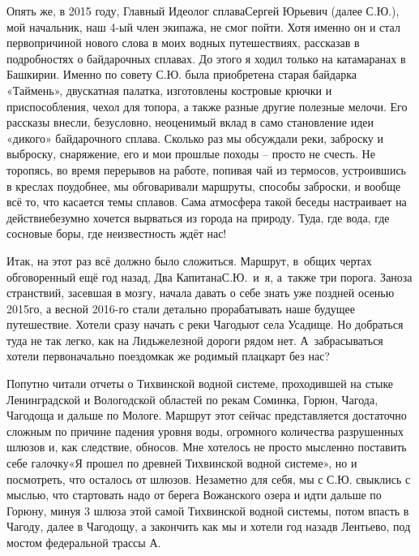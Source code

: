 Опять же, в 2015 году, Главный Идеолог сплава\mdash Сергей Юрьевич (далее С.Ю.), мой начальник, наш 4-ый член экипажа, не смог пойти. Хотя именно он и стал первопричиной нового слова в моих водных путешествиях, рассказав в подробностях о байдарочных сплавах. До этого я ходил только на катамаранах в Башкирии. Именно по совету С.Ю. была приобретена старая байдарка «Таймень», двускатная палатка, изготовлены костровые крючки и приспособления, чехол для топора, а также разные другие полезные мелочи. Его рассказы внесли, безусловно, неоценимый вклад в само становление идеи «дикого» байдарочного сплава. Сколько раз мы обсуждали реки, заброску и выброску, снаряжение, его и мои прошлые походы – просто не счесть. Не торопясь, во время перерывов на работе, попивая чай из термосов, устроившись в креслах поудобнее, мы обговаривали маршруты, способы заброски, и вообще всё то, что касается темы сплавов. Сама атмосфера такой беседы настраивает на действие\mdash безумно хочется вырваться из города на природу. Туда, где вода, где сосновые боры, где неизвестность ждёт нас!

Итак, на этот раз всё должно было сложиться. Маршрут, в~общих чертах обговоренный ещё год назад, Два Капитана\mdash С.Ю.~и~я, а~также три порога. Заноза странствий, засевшая в мозгу, начала давать о себе знать уже поздней осенью 2015\sdash го, а весной 2016-го стали детально прорабатывать наше будущее путешествие. Хотели сразу начать с реки Чагоды\mdash от села Усадище. Но добраться туда не так легко, как на Лидь\mdash железной дороги рядом нет. А~забрасываться хотели первоначально поездом\mdash как же родимый плацкарт без нас? 

Попутно читали отчеты о Тихвинской водной системе, проходившей на стыке Ленинградской и Вологодской областей по рекам Соминка, Горюн, Чагода, Чагодоща и дальше по Мологе. Маршрут этот сейчас представляется достаточно сложным по причине падения уровня воды, огромного количества разрушенных шлюзов и, как следствие, обносов. Мне хотелось не просто мысленно поставить себе галочку\mdash «Я прошел по древней Тихвинской водной системе», но и посмотреть, что осталось от шлюзов. Незаметно для себя, мы с С.Ю. свыклись с мыслью, что стартовать надо от берега Вожанского озера и идти дальше по Горюну, минуя 3 шлюза этой самой Тихвинской водной системы, потом впасть в Чагоду, далее в Чагодощу, а закончить как мы и хотели год назад\mdash в Лентьево, под мостом федеральной трассы А.


